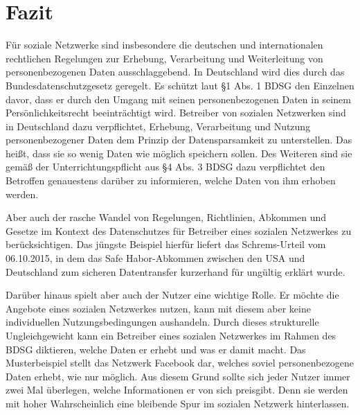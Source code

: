 \chapter{Fazit}
Für soziale Netzwerke sind insbesondere die deutschen und internationalen rechtlichen Regelungen zur Erhebung, Verarbeitung und Weiterleitung von personenbezogenen Daten ausschlaggebend. In Deutschland wird dies durch das Bundesdatenschutzgesetz geregelt.  Es schützt laut §1 Abs. 1 BDSG den Einzelnen davor, dass er durch den Umgang mit seinen personenbezogenen Daten in seinem Persönlichkeitsrecht beeinträchtigt wird. Betreiber von sozialen Netzwerken sind in Deutschland dazu verpflichtet, Erhebung, Verarbeitung und Nutzung personenbezogener Daten dem Prinzip der Datensparsamkeit zu unterstellen. Das heißt, dass sie so wenig Daten wie möglich speichern sollen. Des Weiteren sind sie gemäß der Unterrichtungspflicht aus §4 Abs. 3 BDSG dazu verpflichtet den Betroffen genauestens darüber zu informieren, welche Daten von ihm erhoben werden.
\par
Aber auch der rasche Wandel von Regelungen, Richtlinien, Abkommen und Gesetze im Kontext des Datenschutzes für Betreiber eines sozialen Netzwerkes zu berücksichtigen. Das jüngste Beispiel hierfür liefert das Schrems-Urteil vom 06.10.2015, in dem das Safe Habor-Abkommen zwischen den USA und Deutschland zum sicheren Datentransfer kurzerhand für ungültig erklärt wurde.
\par
Darüber hinaus spielt aber auch der Nutzer eine wichtige Rolle. Er möchte die Angebote eines sozialen Netzwerkes nutzen, kann mit diesem aber keine individuellen Nutzungsbedingungen aushandeln. Durch dieses strukturelle Ungleichgewicht kann ein Betreiber eines sozialen Netzwerkes im Rahmen des \ac{BDSG} diktieren, welche Daten er erhebt und was er damit macht. Das Musterbeispiel stellt das Netzwerk Facebook dar, welches soviel personenbezogene Daten erhebt, wie nur möglich. Aus diesem Grund sollte sich jeder Nutzer immer zwei Mal überlegen, welche Informationen er von sich preisgibt. Denn sie werden mit hoher Wahrscheinlich eine bleibende Spur im sozialen Netzwerk hinterlassen.